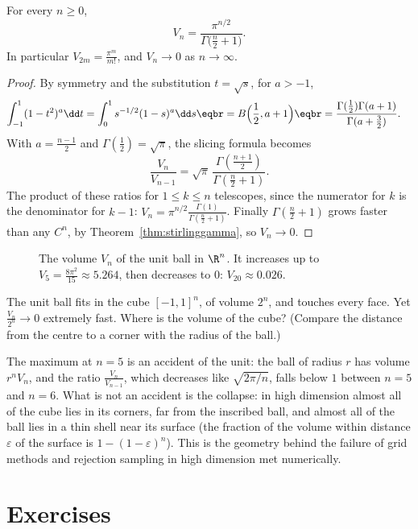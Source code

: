 \begin{theorem}\label{thm:ballvolume}
For every $n\ge0$,
\[
V_n=\frac{\pi^{n/2}}{\Gamma\bigl(\frac n2+1\bigr)}.
\]
In particular $V_{2m}=\frac{\pi^m}{m!}$, and $V_n\to0$ as $n\to\infty$.
\end{theorem}
\begin{proof}
By symmetry and the substitution $t=\sqrt s$, for $a>-1$,
\[
\begin{aligned}\int_{-1}^1(1-t^2)^a\dd t&=\int_0^1s^{-1/2}(1-s)^a\dd s\eqbr=B\Bigl(\frac12,a+1\Bigr)\eqbr=\frac{\Gamma(\frac12)\Gamma(a+1)}{\Gamma(a+\frac32)}.\end{aligned}
\]
With $a=\frac{n-1}2$ and $\Gamma(\frac12)=\sqrt\pi$, the slicing formula becomes
\[
\frac{V_n}{V_{n-1}}=\sqrt\pi\,\frac{\Gamma(\frac{n+1}2)}{\Gamma(\frac n2+1)}.
\]
The product of these ratios for $1\le k\le n$ telescopes, since the numerator for $k$ is the denominator for $k-1$:
$V_n=\pi^{n/2}\frac{\Gamma(1)}{\Gamma(\frac n2+1)}$. Finally $\Gamma(\frac n2+1)$ grows faster than any $C^n$, by Theorem~\ref{thm:stirlinggamma}, so
$V_n\to0$.
\end{proof}

\begin{figure}[ht]
\centering
{}
\caption{The volume $V_n$ of the unit ball in $\R^n$. It increases up to $V_5=\frac{8\pi^2}{15}\approx5.264$, then decreases to $0$:
$V_{20}\approx0.026$.}
\label{fig:ball}
\end{figure}

\begin{think}
The unit ball fits in the cube $[-1,1]^n$, of volume $2^n$, and touches every face. Yet $\frac{V_n}{2^n}\to0$ extremely fast.
Where is the volume of the cube? (Compare the distance from the centre to a corner with the radius of the ball.)
\end{think}

The maximum at $n=5$ is an accident of the unit: the ball of radius $r$ has volume $r^nV_n$, and the ratio $\frac{V_n}{V_{n-1}}$,
which decreases like $\sqrt{2\pi/n}$, falls below $1$ between $n=5$ and $n=6$. What is not an accident is the collapse:
in high dimension almost all of the cube lies in its corners, far from the inscribed ball, and almost all of the ball
lies in a thin shell near its surface (the fraction of the volume within distance $\varepsilon$ of the surface is
$1-(1-\varepsilon)^n$). This is the geometry behind the failure of grid methods and rejection sampling in high dimension met
numerically.

\section{Exercises}

